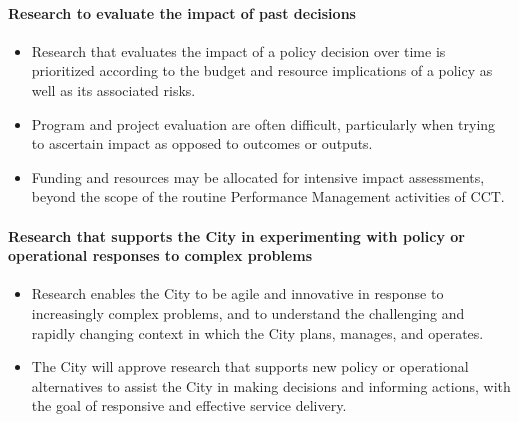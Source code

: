 \documentclass[
]{WileySix}
\providecommand{\tightlist}{%
  \setlength{\itemsep}{0pt}\setlength{\parskip}{0pt}}
\begin{document}
\hypertarget{research-to-evaluate-the-impact-of-past-decisions}{%
\paragraph{Research to evaluate the impact of past decisions}\label{research-to-evaluate-the-impact-of-past-decisions}}

\begin{itemize}
\tightlist
\item
  Research that evaluates the impact of a policy decision over time is prioritized according to the budget and resource implications of a policy as well as its associated risks.
\item
  Program and project evaluation are often difficult, particularly when trying to ascertain impact as opposed to outcomes or outputs.
\item
  Funding and resources may be allocated for intensive impact assessments, beyond the scope of the routine Performance Management activities of CCT.
\end{itemize}

\hypertarget{research-that-supports-the-city-in-experimenting-with-policy-or-operational-responses-to-complex-problems}{%
\paragraph{Research that supports the City in experimenting with policy or operational responses to complex problems}\label{research-that-supports-the-city-in-experimenting-with-policy-or-operational-responses-to-complex-problems}}

\begin{itemize}
\tightlist
\item
  Research enables the City to be agile and innovative in response to increasingly complex problems, and to understand the challenging and rapidly changing context in which the City plans, manages, and operates.
\item
  The City will approve research that supports new policy or operational alternatives to assist the City in making decisions and informing actions, with the goal of responsive and effective service delivery.
\end{itemize}
\end{document}
